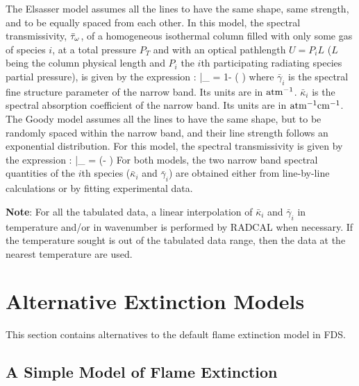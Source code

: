 The Elsasser model assumes all the lines to have the same shape, same strength,
and to be equally spaced from each other. In this model, the spectral
transmissivity, $\bar{\tau}_{\omega}$, of a homogeneous isothermal column filled
with only some gas of species $i$,
at a total pressure $P_T$ and with an optical pathlength $U = P_i L$ ($L$
being the column physical length and $P_i$ the $i$th participating radiating
species partial pressure), is given by the expression \cite{Modest:2003}:
\be\label{eq::Elsasser}
    \bar{\tau}_{\om} = 1- \erf \left(   \right)
\ee
where $\bar{\gamma}_i$ is the spectral fine structure parameter of the narrow
band. Its units are in $\rm atm^{-1}$. $\bar{\kappa}_i$ is the spectral absorption coefficient of the narrow
band. Its units are in $\rm atm^{-1}cm^{-1}$. The Goody model assumes all the lines to have the same shape, but to be randomly
spaced within the narrow band, and their line strength follows an exponential
distribution. For this model, the spectral transmissivity is given by the expression \cite{Modest:2003}:
\be\label{eq::Goody}
    \bar{\tau}_{\om} = \exp\left(- {\displaystyle {}}\right)
\ee
For both models, the two narrow band spectral quantities of the $i$th species ($\bar{\kappa}_i$ and
$\bar{\gamma}_i$) are obtained either from line-by-line calculations or by fitting
experimental data.

\textbf{Note}: For all the tabulated data, a linear interpolation of
$\bar{\kappa}_i$ and $\bar{\gamma}_i$ in temperature and/or in wavenumber is
performed by RADCAL when necessary. If the temperature sought is out of the
tabulated data range, then the data at the nearest temperature are used.

\chapter{Alternative Extinction Models}
\label{alternative_extinction_models}

This section contains alternatives to the default flame extinction model in FDS.

\section{A Simple Model of Flame Extinction}
\label{o2_based_model}

